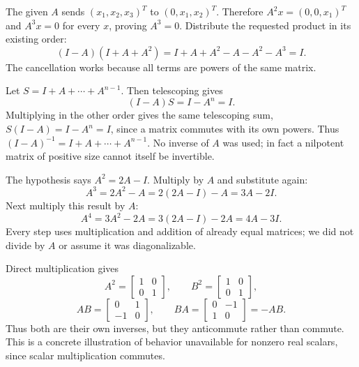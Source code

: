 The given $A$ sends $(x_1,x_2,x_3)^T$ to $(0,x_1,x_2)^T$.
Therefore $A^2x=(0,0,x_1)^T$ and $A^3x=0$ for every $x$, proving $A^3=0$.
Distribute the requested product in its existing order:
\[
 (I-A)(I+A+A^2)=I+A+A^2-A-A^2-A^3=I.
\]
The cancellation works because all terms are powers of the same matrix.

Let $S=I+A+\cdots+A^{n-1}$. Then telescoping gives
\[
 (I-A)S=I-A^n=I.
\]
Multiplying in the other order gives the same telescoping sum,
$S(I-A)=I-A^n=I$, since a matrix commutes with its own powers.
Thus
$\boxed{(I-A)^{-1}=I+A+\cdots+A^{n-1}}$.
No inverse of $A$ was used; in fact a nilpotent matrix of positive size
cannot itself be invertible.

The hypothesis says $A^2=2A-I$. Multiply by $A$ and substitute again:
\[
 A^3=2A^2-A=2(2A-I)-A=3A-2I.
\]
Next multiply this result by $A$:
\[
 A^4=3A^2-2A=3(2A-I)-2A=4A-3I.
\]
Every step uses multiplication and addition of already equal matrices;
we did not divide by $A$ or assume it was diagonalizable.

Direct multiplication gives
\[
 A^2=\begin{bmatrix}1&0\\0&1\end{bmatrix},\qquad
 B^2=\begin{bmatrix}1&0\\0&1\end{bmatrix},
\]
\[
 AB=\begin{bmatrix}0&1\\-1&0\end{bmatrix},\qquad
 BA=\begin{bmatrix}0&-1\\1&0\end{bmatrix}=-AB.
\]
Thus both are their own inverses, but they anticommute rather than commute.
This is a concrete illustration of behavior unavailable for nonzero real
scalars, since scalar multiplication commutes.

